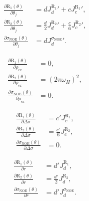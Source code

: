 \documentclass[a4paper,11pt,twoside,openright]{book}
\def\lthtmlcheckvsize{\ifdim\ht\sizebox<\vsize 
  \ifdim\wd\sizebox<\hsize\expandafter\hfill\fi \expandafter\vfill
  \else\expandafter\vss\fi}%
\begin{document}
{\newpage\clearpage
\setcounter{equation}{42}
%
\begin{subequations}\begin{align}
\frac{\partial \mathrm{R}_1(\theta)}{\partial \theta_j} &= d {J_d^{\mathrm{R}_1}}' + c {J_c^{\mathrm{R}_1}}',\\
\frac{\partial \mathrm{R}_2(\theta)}{\partial \theta_j} &= \frac{d}{2} {J_d^{\mathrm{R}_2}}' + \frac{c}{6} {J_c^{\mathrm{R}_2}}',\\
\frac{\partial \sigma_{\scriptscriptstyle \mathrm{NOE}}(\theta)}{\partial \theta_j} &= d {J_d^{\sigma_{\scriptscriptstyle \mathrm{NOE}}}}'.\end{align}\end{subequations}%
\lthtmldisplayZ
\lthtmlcheckvsize\clearpage}

{\newpage\clearpage
\setcounter{equation}{43}
%
\begin{subequations}\begin{align}
\frac{\partial \mathrm{R}_1(\theta)}{\partial \rho_{ex}} &= 0,\\
\frac{\partial \mathrm{R}_2(\theta)}{\partial \rho_{ex}} &= (2 \pi \omega_H)^2,\\
\frac{\partial \sigma_{\scriptscriptstyle \mathrm{NOE}}(\theta)}{\partial \rho_{ex}} &= 0.\end{align}\end{subequations}%
\lthtmldisplayZ
\lthtmlcheckvsize\clearpage}

{\newpage\clearpage
\setcounter{equation}{44}
%
\begin{subequations}\begin{align}
\frac{\partial \mathrm{R}_1(\theta)}{\partial \Delta\sigma} &= c' J_c^{\mathrm{R}_1},\\
\frac{\partial \mathrm{R}_2(\theta)}{\partial \Delta\sigma} &= \frac{c'}{6} J_c^{\mathrm{R}_2},\\
\frac{\partial \sigma_{\scriptscriptstyle \mathrm{NOE}}(\theta)}{\partial \Delta\sigma} &= 0.\end{align}\end{subequations}%
\lthtmldisplayZ
\lthtmlcheckvsize\clearpage}

{\newpage\clearpage
\setcounter{equation}{45}
%
\begin{subequations}\begin{align}
\frac{\partial \mathrm{R}_1(\theta)}{\partial r} &= d' J_d^{\mathrm{R}_1},\\
\frac{\partial \mathrm{R}_2(\theta)}{\partial r} &= \frac{d'}{2} J_d^{\mathrm{R}_2},\\
\frac{\partial \sigma_{\scriptscriptstyle \mathrm{NOE}}(\theta)}{\partial r} &= d' J_d^{\sigma_{\scriptscriptstyle \mathrm{NOE}}}.\end{align}\end{subequations}%
\lthtmldisplayZ
\lthtmlcheckvsize\clearpage}
\end{document}
